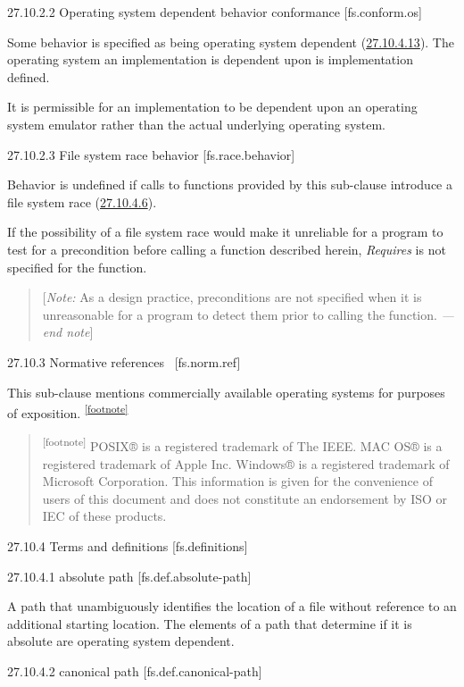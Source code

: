 27.10.2.2 Operating system dependent behavior conformance
{[}fs.conform.os{]}

Some behavior is specified as being operating system dependent
(\hyperref[fs.def.osdep]{27.10.4.13}). The operating system an
implementation is dependent upon is implementation defined.

It is permissible for an implementation to be dependent upon an
operating system emulator rather than the actual underlying operating
system.

27.10.2.3 File system race behavior {[}fs.race.behavior{]}

Behavior is undefined if calls to functions provided by this sub-clause
introduce a file system race (\hyperref[fs.def.race]{27.10.4.6}).

If the possibility of a file system race would make it unreliable for a
program to test for a precondition before calling a function described
herein, \emph{Requires} is not specified for the function.

\begin{quote}
{[}\emph{Note:} As a design practice, preconditions are not specified
when it is unreasonable for a program to detect them prior to calling
the function. \emph{---end note}{]}
\end{quote}

27.10.3 Normative references~ {[}fs.norm.ref{]}

This sub-clause mentions commercially available operating systems for
purposes of exposition.
\textsuperscript{\hyperref[footnote]{{[}footnote{]}}}

\begin{quote}
\textsuperscript{{[}footnote{]}} POSIX® is a registered trademark of The
IEEE. MAC OS® is a registered trademark of Apple Inc. Windows® is a
registered trademark of Microsoft Corporation. This information is given
for the convenience of users of this document and does not constitute an
endorsement by ISO or IEC of these products.
\end{quote}

27.10.4 Terms and definitions {[}fs.definitions{]}

27.10.4.1 absolute path {[}fs.def.absolute-path{]}

A path that unambiguously identifies the location of a file without
reference to an additional starting location. The elements of a path
that determine if it is absolute are operating system dependent.

27.10.4.2 canonical path {[}fs.def.canonical-path{]}

